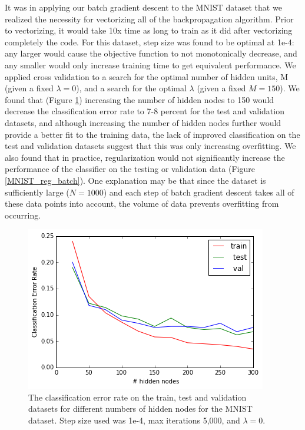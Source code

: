\documentclass[10pt]{article}
\begin{document}
It was in applying our batch gradient descent to the MNIST dataset that we realized the necessity for vectorizing all of the backpropagation algorithm.  Prior to vectorizing, it would take 10x time as long to train as it did after vectorizing completely the code.  For this dataset, step size was found to be optimal at 1e-4: any larger would cause the objective function to not monotonically decrease, and any smaller would only increase training time to get equivalent performance.  We applied cross validation to a search for the optimal number of hidden units, M (given a fixed $\lambda=0$), and a search for the optimal $\lambda$ (given a fixed $M=150$).  We found that (Figure \ref{MNIST_batch_varyM}) increasing the number of hidden nodes to 150 would decrease the classification error rate to 7-8 percent for the test and validation datasets, and although increasing the number of hidden nodes further would provide a better fit to the training data, the lack of improved classification on the test and validation datasets suggest that this was only increasing overfitting.  We also found that in practice, regularization would not significantly increase the performance of the classifier on the testing or validation data (Figure \ref{MNIST_reg_batch}).  One explanation may be that since the dataset is sufficiently large ($N=1000$) and each step of batch gradient descent takes all of these data points into account, the volume of data prevents overfitting from occurring.  
%
\begin{figure}
\centering
\includegraphics[scale=0.5]{MNIST_batch_varyM.png}
\caption{The classification error rate on the train, test and validation datasets for different numbers of hidden nodes for the MNIST dataset.  Step size used was 1e-4, max iterations 5,000, and $\lambda=0$.}
\label{MNIST_batch_varyM}
\end{figure}
%
\end{document}
